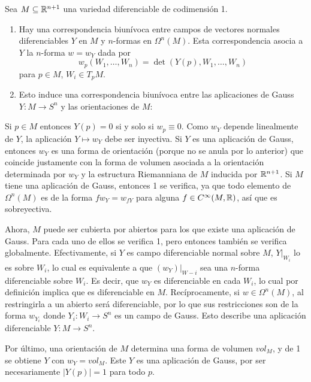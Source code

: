 \documentclass[CV.tex]{subfiles}
\begin{document}
\begin{prop}
Sea $M\subseteq\mathbb{R}^{n+1}$ una variedad diferenciable de codimensión 1.
\begin{enumerate}
\item Hay una correspondencia biunívoca entre campos de vectores normales diferenciables $Y$ en $M$ y $n$-formas en $\Omega^n(M)$. Esta correspondencia asocia a $Y$ la $n$-forma $w=w_Y$ dada por
\[
w_p(W_1,\dots, W_n)=\det(Y(p), W_1,\dots, W_n)
\]
para $p\in M$, $W_i\in T_pM$.
\item Esto induce una correspondencia biunívoca entre las aplicaciones de Gauss $Y:M\to S^n$ y las orientaciones de $M$:
\end{enumerate}
\end{prop}
\begin{dem}
Si $p\in M$ entonces $Y(p)=0$ si y solo si $w_p\equiv 0$. Como $w_Y$ depende linealmente de $Y$, la aplicación $Y\mapsto w_Y$ debe ser inyectiva. Si $Y$ es una aplicación de Gauss, entonces $w_Y$ es una forma de orientación (porque no se anula por lo anterior) que coincide justamente con la forma de volumen asociada a la orientación determinada por $w_Y$ y la estructura Riemanniana de $M$ inducida por $\mathbb{R}^{n+1}$. Si $M$ tiene una aplicación de Gauss, entonces 1 se verifica, ya que todo elemento de $\Omega^n(M)$ es de la forma $fw_Y=w_{fY}$ para alguna $f\in C^{\infty}(M,\mathbb{R})$, así que es sobreyectiva. 

Ahora, $M$ puede ser cubierta por abiertos para los que existe una aplicación de Gauss. Para cada uno de ellos se verifica 1, pero entonces también se verifica globalmente. Efectivamente, si $Y$ es campo diferenciable normal sobre $M$, $Y|_{W_i}$ lo es sobre $W_i$, lo cual es equivalente a que $(w_Y)|_{W-i}$ sea una $n$-forma diferenciable sobre $W_i$. Es decir, que $w_Y$ es diferenciable en cada $W_i$, lo cual por definición implica que es diferenciable en $M$. Recíprocamente, si $w\in\Omega^n(M)$, al restringirla a un abierto será diferenciable, por lo que sus restricciones son de la forma $w_{Y_i}$ donde $Y_i:W_i\to S^n$ es un campo de Gauss. Esto describe una aplicación diferenciable $Y:M\to S^n$. 

Por último, una orientación de $M$ determina una forma de volumen $vol_M$, y de 1 se obtiene $Y$ con $w_Y=vol_M$. Este $Y$ es una aplicación de Gauss, por ser necesariamente $|Y(p)|=1$ para todo $p$.  
\QED
\end{dem}
\end{document}
